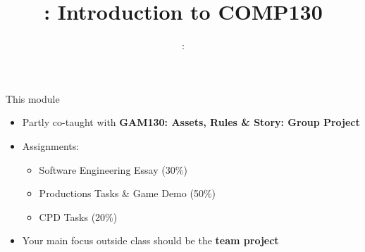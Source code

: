 \usepackage{../../beamerthemeFalmouthGamesAcademy}
\usepackage{multimedia}
\graphicspath{ {../../} }


\usepackage[normalem]{ulem}
\usepackage{wasysym}

\usepackage{pdfpages}

\usetikzlibrary{arrows,automata}




\title{\sessionnumber: Introduction to COMP130}
\subtitle{\modulecode: \moduletitle}

\frame{\titlepage} 


\begin{frame}{This module}
	\begin{itemize}
		\pause\item Partly co-taught with \textbf{GAM130: Assets, Rules \& Story: Group Project}
		\pause\item Assignments:
			\begin{itemize}
				\pause\item Software Engineering Essay (30\%)
				\pause\item Productions Tasks \& Game Demo (50\%)
				\pause\item CPD Tasks (20\%)
			\end{itemize}
		\pause\item Your main focus outside class should be the \textbf{team project}
	\end{itemize}
\end{frame}




